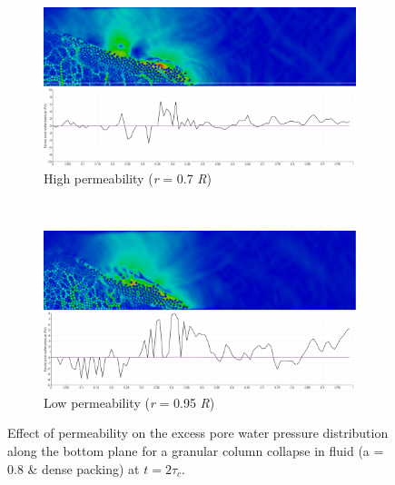 \begin{figure}
\centering
\begin{subfigure}[t]{0.975\textwidth}
	\centering
    \includegraphics[width=\textwidth]{a08/r07_PWP_flow_dense}
    \caption{High permeability (\textit{r} = 0.7 \textit{R})}
    \label{fig:r07_PWP_flow_dense}
\end{subfigure}
\\
\begin{subfigure}[t]{0.975\textwidth}
	\centering
    \includegraphics[width=\textwidth]{a08/r095_PWP_flow_dense}
    \caption{Low permeability (\textit{r} = 0.95 \textit{R})}
    \label{fig:r095_PWP_flow_dense}
\end{subfigure}
\caption{Effect of permeability on the excess pore water pressure distribution 
along the bottom plane for a granular column collapse in fluid (a = 0.8 \& 
dense packing) at $t = 2\tau_c$.}
\label{fig:PWP_flow_dense}
\end{figure}

